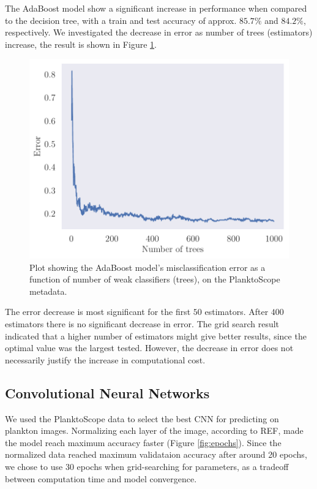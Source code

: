 The AdaBoost model show a significant increase in performance when compared to the decision tree, with a train and test accuracy of approx. $85.7\%$ and $84.2\%$, respectively. We investigated the decrease in error as number of trees (estimators) increase, the result is shown in Figure \ref{fig:be_adaboost_metadata}. 
\begin{figure}
    \centering
    \includegraphics[width=\linewidth]{latex/figures/be_adaboost_planktoscope_metadata.pdf}
    \caption{Plot showing the AdaBoost model's misclassification error as a function of number of weak classifiers (trees), on the PlanktoScope metadata.}
    \label{fig:be_adaboost_metadata}
\end{figure}
The error decrease is most significant for the first $50$ estimators. After $400$ estimators there is no significant decrease in error. The grid search result indicated that a higher number of estimators might give better results, since the optimal value was the largest tested. However, the decrease in error does not necessarily justify the increase in computational cost.

\subsection{Convolutional Neural Networks}

We used the PlanktoScope data to select the best CNN for predicting on plankton images. Normalizing each layer of the image, according to REF, made the model reach maximum accuracy faster (Figure \ref{fig:epochs}). Since the normalized data reached maximum validataion accuracy after around 20 epochs, we chose to use 30 epochs when grid-searching for parameters, as a tradeoff between computation time and model convergence.

